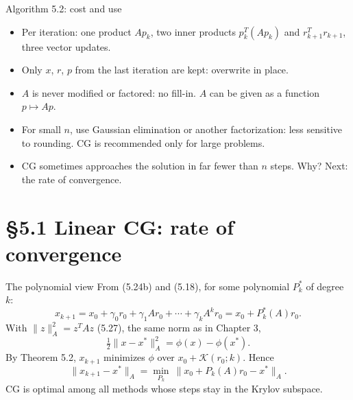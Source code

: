 \documentclass[12pt,aspectratio=169]{beamer}
\newcommand{\K}{\mathcal{K}}
\begin{document}
\begin{frame}{Algorithm 5.2: cost and use}
  \begin{itemize}
    \item Per iteration: one product $Ap_k$, two inner products $p_k^T(Ap_k)$ and $r_{k+1}^Tr_{k+1}$, three vector updates.
    \item Only $x$, $r$, $p$ from the last iteration are kept: overwrite in place.
    \item $A$ is never modified or factored: \alert{no fill-in}. $A$ can be given as a function $p\mapsto Ap$.
    \item For small $n$, use Gaussian elimination or another factorization: less sensitive to rounding.
      CG is recommended only for large problems.
    \item CG sometimes approaches the solution in far fewer than $n$ steps. Why? Next: the rate of convergence.
  \end{itemize}
\end{frame}

\section{\S5.1 Linear CG: rate of convergence}

\begin{frame}{The polynomial view}
  From (5.24b) and (5.18), for some polynomial $P_k^*$ of degree $k$:
  \begin{equation}
    x_{k+1} = x_0+\gamma_0r_0+\gamma_1Ar_0+\cdots+\gamma_kA^kr_0 = x_0+P_k^*(A)r_0. \tag{5.25, 5.26}
  \end{equation}
  With $\|z\|_A^2=z^TAz$ (5.27), the same norm as in Chapter 3,
  \begin{equation}
    \tfrac12\|x-x^*\|_A^2 = \phi(x)-\phi(x^*). \tag{5.28}
  \end{equation}
  By Theorem 5.2, $x_{k+1}$ minimizes $\phi$ over $x_0+\K(r_0;k)$. Hence
  \begin{equation}
    \|x_{k+1}-x^*\|_A = \min_{P_k}\ \|x_0+P_k(A)r_0-x^*\|_A. \tag{5.29}
  \end{equation}
  \alert{CG is optimal among all methods whose steps stay in the Krylov subspace.}
\end{frame}
\end{document}
